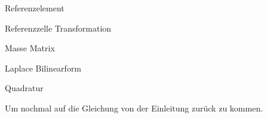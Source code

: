 \begin{Bemerkung} Referenzelement

\end{Bemerkung}

\begin{Satz} Referenzzelle Transformation

\end{Satz}

\begin{Definition} Masse Matrix \\

\end{Definition}

\begin{Definition} Laplace Bilinearform \\

\end{Definition}

\begin{Satz} Quadratur \\

\end{Satz}


Um nochmal auf die Gleichung von der Einleitung zurück zu kommen.


